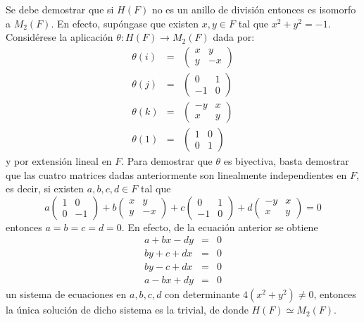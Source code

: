 \begin{proof*}
Se debe demostrar que si $H(F)$ no es un anillo de división entonces es isomorfo a $M_2(F)$. En efecto, supóngase que existen $x,y \in F$ tal que $x^2 + y^2 = -1$. Considérese la aplicación $\theta \colon H(F) \to M_2(F)$ dada por:
\begin{eqnarray*}
\theta(i) &=& \begin{pmatrix}
x & y\\
y & -x
\end{pmatrix}\\
\theta(j) &=& \begin{pmatrix}
0 & 1\\
-1 & 0
\end{pmatrix}\\
\theta(k) &=& \begin{pmatrix}
-y & x \\
x & y 
\end{pmatrix} \\
\theta(1) &=& \begin{pmatrix}
1 & 0 \\
0 & 1
\end{pmatrix}
\end{eqnarray*}
y por extensión lineal en $F$.
Para demostrar que $\theta$ es biyectiva, basta demostrar que las cuatro matrices dadas anteriormente son linealmente independientes en $F$, es decir, si existen $a, b, c, d \in F$ tal que 
\begin{equation*}
a\begin{pmatrix}
1 & 0\\
0 & -1
\end{pmatrix} + b\begin{pmatrix}
x & y \\
y & -x
\end{pmatrix} + c\begin{pmatrix}
0 & 1 \\
-1 & 0
\end{pmatrix} + d\begin{pmatrix}
-y & x\\
x & y
\end{pmatrix} = 0
\end{equation*}
entonces $a = b = c = d = 0$. En efecto, de la ecuación anterior se obtiene
\begin{eqnarray*}
a + bx - dy &=& 0\\
by + c + dx &=& 0 \\
by -c + dx &=& 0 \\
a -bx + dy &=& 0
\end{eqnarray*}
un sistema de ecuaciones en $a, b, c,d$ con determinante $4(x^2 + y^2) \neq 0$, entonces la única solución de dicho sistema es la trivial, de donde $H(F) \simeq M_2(F)$.
\end{proof*}

